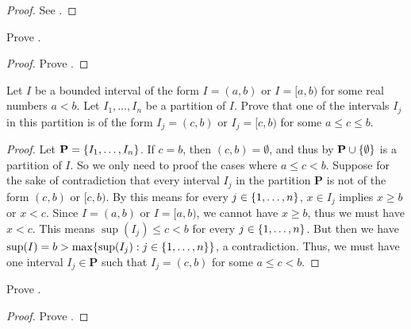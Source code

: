 \begin{proof}
  See .
\end{proof}

\begin{ex}\label{i:ex:11.1.2}
  Prove .
\end{ex}

\begin{proof}
  Prove .
\end{proof}

\begin{ex}\label{i:ex:11.1.3}
  Let \(I\) be a bounded interval of the form \(I = (a, b)\) or \(I = [a, b)\) for some real numbers \(a < b\).
  Let \(I_1, \dots, I_n\) be a partition of \(I\).
  Prove that one of the intervals \(I_j\) in this partition is of the form \(I_j = (c, b)\) or \(I_j = [c, b)\) for some \(a \leq c \leq b\).
\end{ex}

\begin{proof}
  Let \(\mathbf{P} = \left\lbrace I_1, \dots, I_n\right\rbrace\).
  If \(c = b\), then \((c, b) = \emptyset\), and thus by  \(\mathbf{P} \cup \left\lbrace\emptyset\right\rbrace\) is a partition of \(I\).
  So we only need to proof the cases where \(a \leq c < b\).
  Suppose for the sake of contradiction that every interval \(I_j\) in the partition \(\mathbf{P}\) is not of the form \((c, b)\) or \([c, b)\).
  By  this means for every \(j \in \left\lbrace1, \dots, n\right\rbrace\), \(x \in I_j\) implies \(x \geq b\) or \(x < c\).
  Since \(I = (a, b)\) or \(I = [a, b)\), we cannot have \(x \geq b\), thus we must have \(x < c\).
  This means \(\sup(I_j) \leq c < b\) for every \(j \in \left\lbrace1, \dots, n\right\rbrace\).
  But then we have \(\sup(I) = b > \max\set{\sup(I_j) : j \in \set{1, \dots, n}}\), a contradiction.
  Thus, we must have one interval \(I_j \in \mathbf{P}\) such that \(I_j = (c, b)\) for some \(a \leq c < b\).
\end{proof}

\begin{ex}\label{i:ex:11.1.4}
  Prove .
\end{ex}

\begin{proof}
  Prove .
\end{proof}

